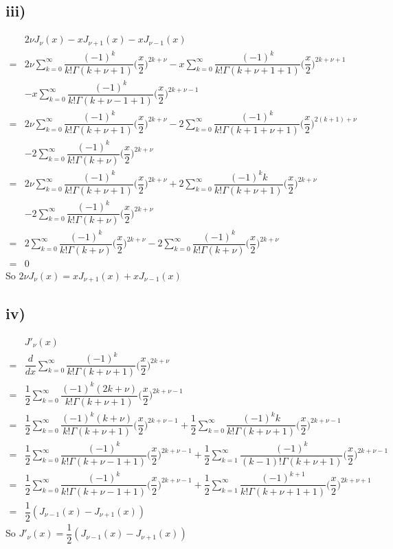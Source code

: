 \documentclass[a4paper,12pt,titlepage]{article}
\begin{document}
\subsection*{iii)}
\begin{align*}
&2\nu J_{\nu}(x)-xJ_{\nu+1}(x)-xJ_{\nu-1}(x)\\
=&2\nu\sum\limits_{k=0}^{\infty}\dfrac{(-1)^k}{k!\Gamma(k+\nu+1)}\Big(\dfrac{x}{2}\Big)^{2k+\nu}-x\sum\limits_{k=0}^{\infty}\dfrac{(-1)^k}{k!\Gamma(k+\nu+1+1)}\Big(\dfrac{x}{2}\Big)^{2k+\nu+1}\\
&-x\sum\limits_{k=0}^{\infty}\dfrac{(-1)^k}{k!\Gamma(k+\nu-1+1)}\Big(\dfrac{x}{2}\Big)^{2k+\nu-1}\\
=&2\nu\sum\limits_{k=0}^{\infty}\dfrac{(-1)^k}{k!\Gamma(k+\nu+1)}\Big(\dfrac{x}{2}\Big)^{2k+\nu}-2\sum\limits_{k=0}^{\infty}\dfrac{(-1)^k}{k!\Gamma(k+1+\nu+1)}\Big(\dfrac{x}{2}\Big)^{2(k+1)+\nu}\\
&-2\sum\limits_{k=0}^{\infty}\dfrac{(-1)^k}{k!\Gamma(k+\nu)}\Big(\dfrac{x}{2}\Big)^{2k+\nu}\\
=&2\nu\sum\limits_{k=0}^{\infty}\dfrac{(-1)^k}{k!\Gamma(k+\nu+1)}\Big(\dfrac{x}{2}\Big)^{2k+\nu}+2\sum\limits_{k=0}^{\infty}\dfrac{(-1)^kk}{k!\Gamma(k+\nu+1)}\Big(\dfrac{x}{2}\Big)^{2k+\nu}\\
&-2\sum\limits_{k=0}^{\infty}\dfrac{(-1)^k}{k!\Gamma(k+\nu)}\Big(\dfrac{x}{2}\Big)^{2k+\nu}\\
=&2\sum\limits_{k=0}^{\infty}\dfrac{(-1)^k}{k!\Gamma(k+\nu)}\Big(\dfrac{x}{2}\Big)^{2k+\nu}-2\sum\limits_{k=0}^{\infty}\dfrac{(-1)^k}{k!\Gamma(k+\nu)}\Big(\dfrac{x}{2}\Big)^{2k+\nu}\\
=&0
\end{align*}
So $2\nu J_{\nu}(x)=xJ_{\nu+1}(x)+xJ_{\nu-1}(x)$

\subsection*{iv)}
\begin{align*}
&J'_{\nu}(x)\\
=&\dfrac{d}{dx}\sum\limits_{k=0}^{\infty}\dfrac{(-1)^k}{k!\Gamma(k+\nu+1)}\Big(\dfrac{x}{2}\Big)^{2k+\nu}\\
=&\dfrac{1}{2}\sum\limits_{k=0}^{\infty}\dfrac{(-1)^k(2k+\nu)}{k!\Gamma(k+\nu+1)}\Big(\dfrac{x}{2}\Big)^{2k+\nu-1}\\
=&\dfrac{1}{2}\sum\limits_{k=0}^{\infty}\dfrac{(-1)^k(k+\nu)}{k!\Gamma(k+\nu+1)}\Big(\dfrac{x}{2}\Big)^{2k+\nu-1}+\dfrac{1}{2}\sum\limits_{k=0}^{\infty}\dfrac{(-1)^kk}{k!\Gamma(k+\nu+1)}\Big(\dfrac{x}{2}\Big)^{2k+\nu-1}\\
=&\dfrac{1}{2}\sum\limits_{k=0}^{\infty}\dfrac{(-1)^k}{k!\Gamma(k+\nu-1+1)}\Big(\dfrac{x}{2}\Big)^{2k+\nu-1}+\dfrac{1}{2}\sum\limits_{k=1}^{\infty}\dfrac{(-1)^k}{(k-1)!\Gamma(k+\nu+1)}\Big(\dfrac{x}{2}\Big)^{2k+\nu-1}\\
=&\dfrac{1}{2}\sum\limits_{k=0}^{\infty}\dfrac{(-1)^k}{k!\Gamma(k+\nu-1+1)}\Big(\dfrac{x}{2}\Big)^{2k+\nu-1}+\dfrac{1}{2}\sum\limits_{k=1}^{\infty}\dfrac{(-1)^{k+1}}{k!\Gamma(k+\nu+1+1)}\Big(\dfrac{x}{2}\Big)^{2k+\nu+1}\\
=&\dfrac{1}{2}(J_{\nu-1}(x)-J_{\nu+1}(x))
\end{align*}
So $J'_{\nu}(x)=\dfrac{1}{2}(J_{\nu-1}(x)-J_{\nu+1}(x))$
 
\end{document}
